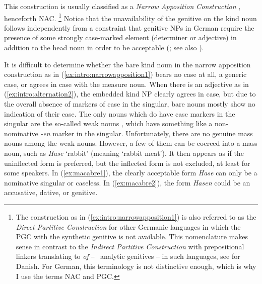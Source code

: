 \begin{exe}
  \ex\label{ex:intro:narrowapposition}
  \begin{xlist}
  \end{xlist}
\end{exe}

This construction is usually classified as a \textit{Narrow Apposition Construction} \citep{Loebel1986}, henceforth NAC.%
\footnote{The construction as in (\ref{ex:intro:narrowapposition1}) is also referred to as the \textit{Direct Partitive Construction} for other Germanic languages in which the PGC with the synthetic genitive is not available.
This nomenclature makes sense in contrast to the \textit{Indirect Partitive Construction} with prepositional linkers translating to \textit{of} -- \ie\ analytic genitives -- in such languages, see \cite{HankamerMikkelsen2008} for Danish.
For German, this terminology is not distinctive enough, which is why I use the terms NAC and PGC.}
Notice that the unavailability of the genitive on the kind noun follows independently from a constraint that genitive NPs in German require the presence of some strongly case-marked element (determiner or adjective) in addition to the head noun in order to be acceptable (\citealp{GallmannLindauer1994,Schachtl1989}; see also \citealp[160]{Eisenberg2013b}).

It is difficult to determine whether the bare kind noun in the narrow apposition construction as in (\ref{ex:intro:narrowapposition1}) bears no case at all, a generic case, or agrees in case with the measure noun.
When there is an adjective as in (\ref{ex:intro:alternation2}), the embedded kind NP clearly agrees in case, but due to the overall absence of markers of case in the singular, bare nouns mostly show no indication of their case.
The only nouns which do have case markers in the singular are the so-called weak nouns \citep{Koepcke1995,Schaefer2016c}, which have something like a non-nominative \textit{-en} marker in the singular.
Unfortunately, there are no genuine mass nouns among the weak nouns.
However, a few of them can be coerced into a mass noun, such as \textit{Hase} `rabbit' (meaning `rabbit meat').
It then appears as if the uninflected form is preferred, but the inflected form is not excluded, at least for some speakers.
In (\ref{ex:macabre1}), the clearly acceptable form \textit{Hase} can only be a nominative singular or caseless.
In (\ref{ex:macabre2}), the form \textit{Hasen} could be an accusative, dative, or genitive.

